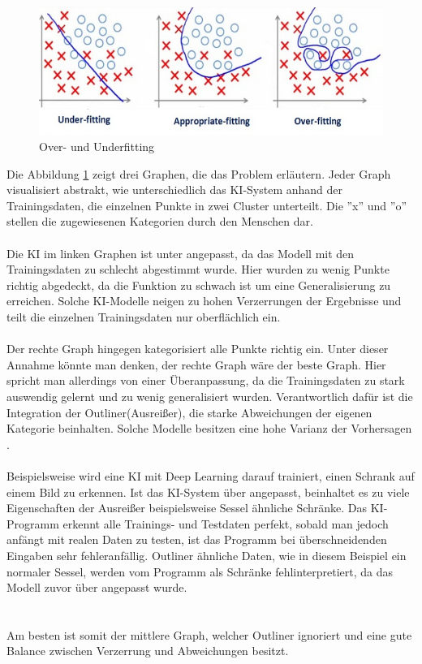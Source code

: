 \documentclass[12pt,oneside,a4paper,parskip]{scrbook}
\begin{document}
\begin{figure}[h]
	\begin{center}
		\includegraphics[width=12cm]{Bilder/overUnderfitting.png}
		\caption{Over- und Underfitting\cite{overUnderfitting}}
		\label{fig:overUnderFitting}
	\end{center}
\end{figure}
Die Abbildung \ref{fig:overUnderFitting} zeigt drei Graphen, die das Problem erläutern. Jeder Graph visualisiert abstrakt, wie unterschiedlich das KI-System anhand der Trainingsdaten, die einzelnen Punkte in zwei Cluster unterteilt. Die ''x'' und ''o'' stellen die zugewiesenen Kategorien durch den Menschen dar.
\\\\
Die KI im linken Graphen ist unter angepasst, da das Modell mit den Trainingsdaten zu schlecht abgestimmt wurde. Hier wurden zu wenig Punkte richtig abgedeckt, da die Funktion zu schwach ist um eine Generalisierung zu erreichen. Solche KI-Modelle neigen zu hohen Verzerrungen der Ergebnisse und teilt die einzelnen Trainingsdaten nur oberflächlich ein.
\\\\
Der rechte Graph hingegen kategorisiert alle Punkte richtig ein. Unter dieser Annahme könnte man denken, der rechte Graph wäre der beste Graph. Hier spricht man allerdings von einer Überanpassung, da die Trainingsdaten zu stark auswendig gelernt und zu wenig generalisiert wurden. Verantwortlich dafür ist die Integration der Outliner(Ausreißer), die starke Abweichungen der eigenen Kategorie beinhalten. Solche Modelle besitzen eine hohe Varianz der Vorhersagen \cite{overUnderfitting}.
\\\\
Beispielsweise wird eine KI mit Deep Learning darauf trainiert, einen Schrank auf einem Bild zu erkennen. Ist das KI-System über angepasst, beinhaltet es zu viele Eigenschaften der Ausreißer beispielsweise Sessel ähnliche Schränke. Das KI-Programm erkennt alle Trainings- und Testdaten perfekt, sobald man jedoch anfängt mit realen Daten zu testen, ist das Programm bei überschneidenden Eingaben sehr fehleranfällig. Outliner ähnliche Daten, wie in diesem Beispiel ein normaler Sessel, werden vom Programm als Schränke fehlinterpretiert, da das Modell zuvor über angepasst wurde. \\
\\\\
Am besten ist somit der mittlere Graph, welcher Outliner ignoriert und eine gute Balance zwischen Verzerrung und Abweichungen besitzt.
\end{document}
